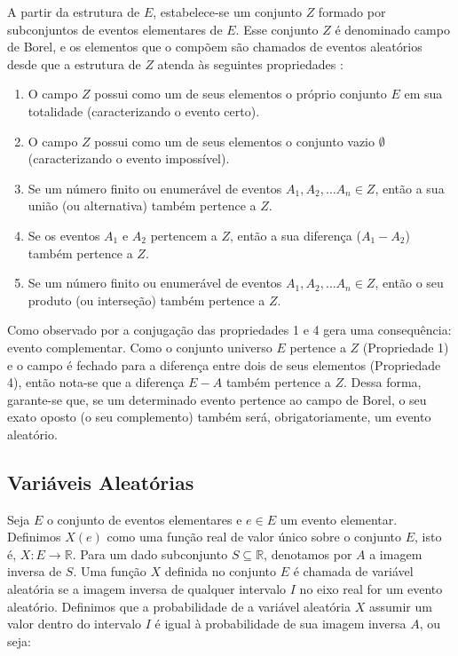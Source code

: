 \documentclass[
    12pt,                %
    openright,           %
    oneside,             %
    a4paper,             %
    english,             %
    brazil               %
]{abntex2}
\begin{document}
A partir da estrutura de $E$, estabelece-se um conjunto $Z$ formado por subconjuntos de eventos elementares de $E$. Esse conjunto $Z$ é denominado campo de Borel, 
e os elementos que o compõem são chamados de eventos aleatórios desde que a estrutura de $Z$ atenda às seguintes propriedades \cite{FISZ}:

\begin{enumerate}
    \item O campo $Z$ possui como um de seus elementos o próprio conjunto $E$ em sua totalidade (caracterizando o evento certo).
    \item O campo $Z$ possui como um de seus elementos o conjunto vazio $\emptyset$ (caracterizando o evento impossível).
    \item Se um número finito ou enumerável de eventos $A_1, A_2, \dots A_n \in Z$, então a sua união (ou alternativa) também pertence a $Z$.
    \item Se os eventos $A_1$ e $A_2$ pertencem a $Z$, então a sua diferença ($A_1 - A_2$) também pertence a $Z$.
    \item Se um número finito ou enumerável de eventos $A_1, A_2, \dots A_n \in Z$, então o seu produto (ou interseção) também pertence a $Z$.
\end{enumerate}

Como observado por  a conjugação das propriedades 1 e 4 gera uma consequência: evento complementar. Como o conjunto universo $E$ pertence a $Z$ (Propriedade 1) 
e o campo é fechado para a diferença entre dois de seus elementos (Propriedade 4), então nota-se que a diferença $E - A$ também pertence a $Z$. Dessa forma, garante-se que, 
se um determinado evento pertence ao campo de Borel, o seu exato oposto (o seu complemento) também será, obrigatoriamente, um evento aleatório.

\subsection{Variáveis Aleatórias}

Seja $E$ o conjunto de eventos elementares e $e \in E$ um evento elementar. Definimos $X(e)$ como uma função real de valor único sobre o conjunto $E$, isto é, $X: E \to 
\mathbb{R}$. Para um dado subconjunto $S \subseteq \mathbb{R}$, denotamos por $A$ a imagem inversa de $S$.
Uma função $X$ definida no conjunto $E$ é chamada de variável aleatória se a imagem inversa de qualquer intervalo $I$ no eixo real for um evento aleatório.
Definimos que a probabilidade de a variável aleatória $X$ assumir um valor dentro do intervalo $I$ é igual à probabilidade de sua imagem inversa $A$, ou seja:
\end{document}

